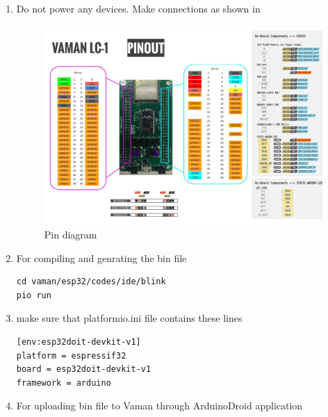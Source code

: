 \begin{enumerate}[label=\thesubsection.\arabic*.,ref=\thesubsection.\theenumi]
\item Do not power any devices.  Make connections as shown in  
	\begin{figure}[!ht]
\centering
\includegraphics[width = \textwidth]{vaman/fpga/setup/figs/pin_sheet.png}
\caption{Pin diagram}
\label{fig:vaman/fpga/setup/pin_sheet}
\end{figure}
			\begin{table}[!h]
				\centering
		
		\caption{}
		\label{tab:vaman/uart/rpi-vaman-uart}
	\end{table}
\item For compiling and genrating the bin file 
\begin{lstlisting}
cd vaman/esp32/codes/ide/blink
pio run
\end{lstlisting}
\item make sure that platformio.ini file contains these lines
\begin{lstlisting}
[env:esp32doit-devkit-v1]
platform = espressif32
board = esp32doit-devkit-v1
framework = arduino
\end{lstlisting}
\item For uploading bin file to Vaman through ArduinoDroid application 

\end{enumerate}
